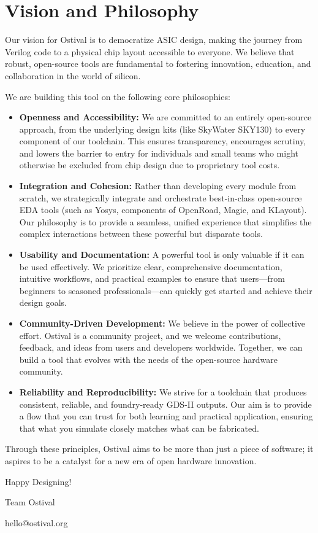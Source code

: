\chapter*{Vision and Philosophy}

Our vision for Ostival is to democratize ASIC design, making the journey from Verilog code to a physical chip layout accessible to everyone. We believe that robust, open-source tools are fundamental to fostering innovation, education, and collaboration in the world of silicon.

We are building this tool on the following core philosophies:

\begin{itemize}
    \item \textbf{Openness and Accessibility:} We are committed to an entirely open-source approach, from the underlying design kits (like SkyWater SKY130) to every component of our toolchain. This ensures transparency, encourages scrutiny, and lowers the barrier to entry for individuals and small teams who might otherwise be excluded from chip design due to proprietary tool costs.
    \item \textbf{Integration and Cohesion:} Rather than developing every module from scratch, we strategically integrate and orchestrate best-in-class open-source EDA tools (such as Yosys, components of OpenRoad, Magic, and KLayout). Our philosophy is to provide a seamless, unified experience that simplifies the complex interactions between these powerful but disparate tools.
    \item \textbf{Usability and Documentation:} A powerful tool is only valuable if it can be used effectively. We prioritize clear, comprehensive documentation, intuitive workflows, and practical examples to ensure that users—from beginners to seasoned professionals—can quickly get started and achieve their design goals.
    \item \textbf{Community-Driven Development:} We believe in the power of collective effort. Ostival is a community project, and we welcome contributions, feedback, and ideas from users and developers worldwide. Together, we can build a tool that evolves with the needs of the open-source hardware community.
    \item \textbf{Reliability and Reproducibility:} We strive for a toolchain that produces consistent, reliable, and foundry-ready GDS-II outputs. Our aim is to provide a flow that you can trust for both learning and practical application, ensuring that what you simulate closely matches what can be fabricated.
\end{itemize}


Through these principles, Ostival aims to be more than just a piece of software; it aspires to be a catalyst for a new era of open hardware innovation.


\vfill

Happy Designing!

Team Ostival

hello@ostival.org